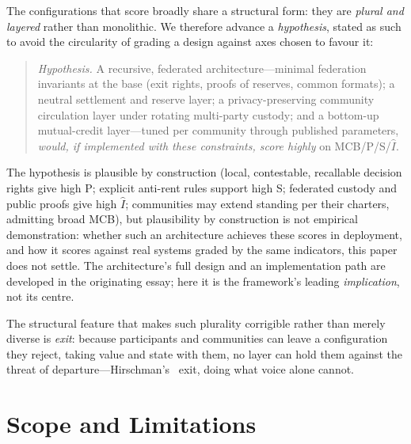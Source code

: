\documentclass[11pt]{article}
\theoremstyle{definition}
\newcommand{\Iax}{\ensuremath{\hat{I}}}
\begin{document}
The configurations that score broadly share a structural form: they are \emph{plural
and layered} rather than monolithic. We therefore advance a \emph{hypothesis}, stated
as such to avoid the circularity of grading a design against axes chosen to favour it:

\begin{quote}
\emph{Hypothesis.} A recursive, federated architecture---minimal federation
invariants at the base (exit rights, proofs of reserves, common formats); a neutral
settlement and reserve layer; a privacy-preserving community circulation layer under
rotating multi-party custody; and a bottom-up mutual-credit layer---tuned per
community through published parameters, \emph{would, if implemented with these
constraints, score highly} on MCB/P/S/$\Iax$.
\end{quote}

The hypothesis is plausible by construction (local, contestable, recallable decision
rights give high P; explicit anti-rent rules support high S; federated custody and
public proofs give high $\Iax$; communities may extend standing per their charters,
admitting broad MCB), but plausibility by construction is not empirical demonstration:
whether such an architecture achieves these scores in deployment, and how it scores
against real systems graded by the same indicators, this paper does not settle. The
architecture's full design and an implementation path are developed in the originating
essay; here it is the framework's leading \emph{implication}, not its centre.

The structural feature that makes such plurality corrigible rather than merely diverse
is \emph{exit}: because participants and communities can leave a configuration they
reject, taking value and state with them, no layer can hold them against the threat of
departure---Hirschman's~\cite{hirschman1970} exit, doing what voice alone cannot.

\section{Scope and Limitations}
\label{sec:limits}
\end{document}
